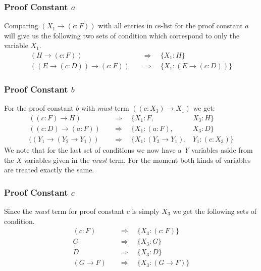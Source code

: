 \subsubsection[look up proof constant a]{Proof Constant $a$}
Comparing $(X_1 \rightarrow (c:F))$ with all entries in cs-list for the proof constant $a$ will give us the following two sets of condition which correspond to only the variable $X_1$.
\begin{align}
	(H \rightarrow (c:F)) & \quad \Rightarrow \quad \{X_1: H\} \\ 
	((E \rightarrow (c:D)) \rightarrow (c:F)) & \quad \Rightarrow  \quad \{X_1: (E \rightarrow (c:D))\} \label{condition:a}
\end{align}

\subsubsection[look up proof constant b]{Proof Constant $b$}
For the proof constant $b$ with \emph{must}-term $((c:X_3) \rightarrow X_1)$ we get:
\begin{align}
	((c:F) \rightarrow H) & \quad \Rightarrow \quad \{X_1: F, & X_3: H\}\\ 
	((c:D) \rightarrow (a:F)) & \quad \Rightarrow \quad \{X_1: (a:F), & X_3: D\}\\ 
	((Y_1 \rightarrow (Y_2 \rightarrow Y_1)) & \quad \Rightarrow \quad \{X_1: (Y_2 \rightarrow Y_1), & Y_1: (c:X_3)\} \label{condition:b}
\end{align}
We note that for the last set of conditions we now have a \emph{Y} variables aside from the \emph{X} variables given in the \emph{must} term. For the moment both kinds of variables are treated exactly the same.

\subsubsection[look up proof constant c]{Proof Constant $c$}
Since the \emph{must} term for proof constant $c$ is simply $X_3$ we get the following sets of condition.
\begin{align}
	(c:F) & \quad \Rightarrow \quad \{X_3: (c:F)\} \\ 
	G & \quad \Rightarrow \quad \{X_3: G\} \\ 
	D & \quad \Rightarrow \quad \{X_3: D\}\label{condition:c} \\ 
	(G \rightarrow F) & \quad \Rightarrow \quad \{X_3: (G \rightarrow F)\} 
\end{align}

